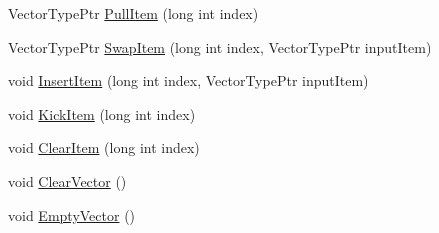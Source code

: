\begin{DoxyCompactItemize}
\item 
Vector\+Type\+Ptr \hyperlink{class_c_h_i___v_e_c_t_o_r_ae646184dd90d776f313e502780adf636_ae646184dd90d776f313e502780adf636}{Pull\+Item} (long int index)
\item 
Vector\+Type\+Ptr \hyperlink{class_c_h_i___v_e_c_t_o_r_ac2de16159d3b3bcc5bc9944121fccf51_ac2de16159d3b3bcc5bc9944121fccf51}{Swap\+Item} (long int index, Vector\+Type\+Ptr input\+Item)
\item 
void \hyperlink{class_c_h_i___v_e_c_t_o_r_ae0c82697e82c997505baf414d13f31f2_ae0c82697e82c997505baf414d13f31f2}{Insert\+Item} (long int index, Vector\+Type\+Ptr input\+Item)
\item 
void \hyperlink{class_c_h_i___v_e_c_t_o_r_a1b9cf7d3ed0c01de4f1aceb306cb0e65_a1b9cf7d3ed0c01de4f1aceb306cb0e65}{Kick\+Item} (long int index)
\item 
void \hyperlink{class_c_h_i___v_e_c_t_o_r_a218fc2c4e4307955a008aba0a25989db_a218fc2c4e4307955a008aba0a25989db}{Clear\+Item} (long int index)
\item 
void \hyperlink{class_c_h_i___v_e_c_t_o_r_abc2f116e9f1b9f4bfb192c484d6dd71d_abc2f116e9f1b9f4bfb192c484d6dd71d}{Clear\+Vector} ()
\item 
void \hyperlink{class_c_h_i___v_e_c_t_o_r_a8a52d15a1ddb517edfb685765b96a057_a8a52d15a1ddb517edfb685765b96a057}{Empty\+Vector} ()
\end{DoxyCompactItemize}
